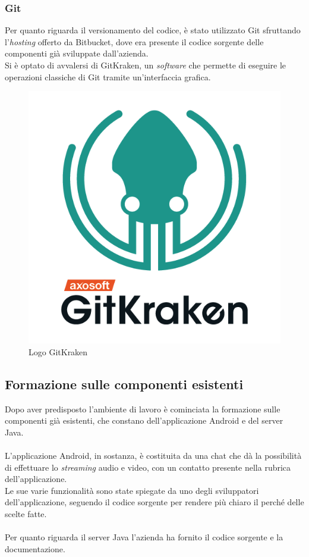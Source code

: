       \subsubsection{Git}
      Per quanto riguarda il versionamento del codice, è stato utilizzato Git sfruttando l'\textit{hosting} offerto da Bitbucket, dove era presente il codice sorgente delle componenti già sviluppate dall'azienda.\\
      Si è optato di avvalersi di GitKraken, un \textit{software} che permette di eseguire le operazioni classiche di Git tramite un'interfaccia grafica.
      \begin{figure}[h]
        \centering
        \includegraphics[scale=0.5]{immagini/gitkraken.png}
        \caption{Logo GitKraken}
        \label{logoKraken}
      \end{figure}
    \newpage
    \subsection{Formazione sulle componenti esistenti}
    Dopo aver predisposto l'ambiente di lavoro è cominciata la formazione sulle componenti già esistenti, che constano dell'applicazione Android e del server Java.\\\\
    L'applicazione Android, in sostanza, è costituita da una chat che dà la possibilità di effettuare lo \textit{streaming} audio e video, con un contatto presente nella rubrica dell'applicazione.\\
    Le sue varie funzionalità sono state spiegate da uno degli sviluppatori dell'applicazione, seguendo il codice sorgente per rendere più chiaro il perché delle scelte fatte.\\\\
    Per quanto riguarda il server Java l'azienda ha fornito il codice sorgente e la documentazione.
